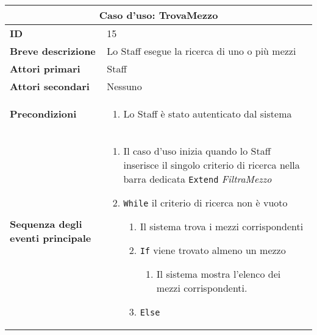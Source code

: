 \documentclass[a4paper]{report}
\begin{document}
\clearpage
\begin{table}[H]
\vspace*{-0cm}
\renewcommand{\arraystretch}{1.9}
\begin{tabular}{|p{3.9cm}|p{9.9cm}|}
\hline
\multicolumn{2}{|c|}{\textbf{Caso d’uso: TrovaMezzo}} \\ \hline
        \textbf{ID} & 15 \\ \hline
        \textbf{Breve descrizione} & Lo Staff esegue la ricerca di uno o più mezzi \\ \hline
	\textbf{Attori primari} & Staff \\ \hline
	\textbf{Attori secondari} & Nessuno \\ \hline
	\textbf{Precondizioni} & \begin{enumerate}[label=\arabic*.,leftmargin=14pt,labelsep=0.5em,topsep=0pt,partopsep=0pt,parsep=0pt,itemsep=0pt]
        \item Lo Staff è stato autenticato dal sistema
    \end{enumerate} \\ \hline
	\textbf{Sequenza degli eventi principale} & 
\begin{enumerate}[leftmargin=14pt,label=\arabic*.,labelsep=0.5em,topsep=0pt,partopsep=0pt,parsep=0pt,itemsep=0pt]
    \item Il caso d’uso inizia quando lo Staff inserisce il singolo criterio di ricerca nella barra dedicata 
    \newline \texttt{Extend} \textit{FiltraMezzo}
    \item \texttt{While} il criterio di ricerca non è vuoto
    \begin{enumerate}[label=\arabic{enumi}.\arabic*.,leftmargin=22pt,labelsep=0.5em,topsep=0pt,partopsep=0pt,parsep=0pt,itemsep=0pt]
        \item Il sistema trova i mezzi corrispondenti
        \item \texttt{If} viene trovato almeno un mezzo
        \begin{enumerate}[label=\arabic{enumi}.\arabic{enumii}.\arabic*.,leftmargin=22pt,labelsep=0.5em,topsep=0pt,partopsep=0pt,parsep=0pt,itemsep=0pt]
            \item Il sistema mostra l’elenco dei mezzi corrispondenti.
        \end{enumerate}
        \item \texttt{Else}
        \begin{enumerate}[label=\arabic{enumi}.\arabic{enumii}.\arabic*.,leftmargin=22pt,labelsep=0.5em,topsep=0pt,partopsep=0pt,parsep=0pt,itemsep=0pt]

\end{enumerate}
\end{enumerate}
\end{enumerate}
\end{tabular}
\end{table}
\end{document}
